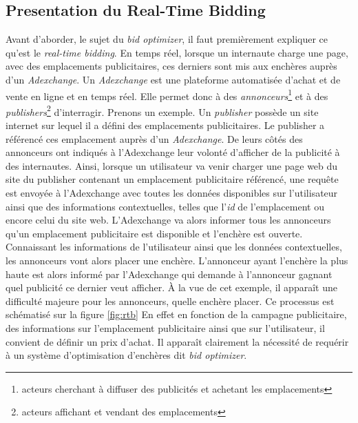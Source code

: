     \subsection{Presentation du Real-Time Bidding}
        Avant d'aborder, le sujet du \emph{bid optimizer}, il faut premièrement expliquer ce qu'est le 
        \emph{real-time bidding}. En temps réel, lorsque un internaute charge une page, avec des emplacements 
        publicitaires, ces derniers sont mis aux enchères auprès d'un \emph{Adexchange}. Un \emph{Adexchange} est 
        une plateforme automatisée d'achat et de vente en ligne et en temps réel. Elle permet donc à des 
        \emph{annonceurs}\footnote{acteurs cherchant à diffuser des publicités et achetant les emplacements} 
        et à des \emph{publishers}\footnote{acteurs affichant et vendant des emplacements} d'interragir. Prenons
        un exemple. Un \emph{publisher} possède un site internet sur lequel il a défini des emplacements 
        publicitaires. Le publisher a référencé ces emplacement auprès d'un  \emph{Adexchange}. De leurs côtés des 
        annonceurs ont indiqués à l'Adexchange leur volonté d'afficher de la publicité à des internautes. Ainsi,
        lorsque un utilisateur va venir charger une page web du site du publisher contenant un emplacement 
        publicitaire référencé, une requête est envoyée à l'Adexchange avec toutes les données disponibles sur 
        l'utilisateur ainsi que des informations contextuelles, telles que l'\emph{id} de l'emplacement ou encore 
        celui du site web. L'Adexchange va alors informer tous les annonceurs qu'un emplacement publicitaire est 
        disponible et l'enchère est ouverte. Connaissant les informations de l'utilisateur ainsi que les données 
        contextuelles, les annonceurs vont alors placer une enchère. L'annonceur ayant l'enchère la plus haute est 
        alors informé par l'Adexchange qui demande à l'annonceur gagnant quel publicité ce dernier veut afficher.
        À la vue de cet exemple, il apparaît une difficulté majeure pour les annonceurs, quelle enchère placer. Ce processus est schématisé sur la figure \ref{fig:rtb} En 
        effet en fonction de la campagne publicitaire, des informations sur l'emplacement publicitaire ainsi que 
        sur l'utilisateur, il convient de définir un prix d'achat. Il apparaît clairement la nécessité de 
        requérir à un système d'optimisation d'enchères dit \emph{bid optimizer}.
